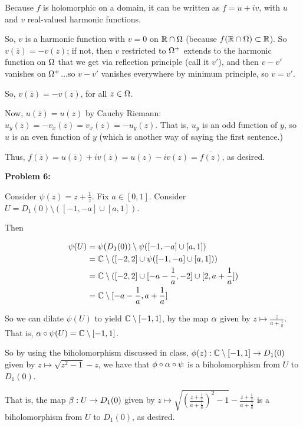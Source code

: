 \documentclass[a4paper,12pt]{article}
\begin{document}
Because $f$ is holomorphic on a domain, it can be written as $f=u+iv$, with $u$ and $v$ real-valued harmonic functions. 

So, $v$ is a harmonic function with $v=0$ on $\mathbb{R} \cap \Omega$ (because $f(\mathbb{R} \cap \Omega) \subset \mathbb{R}$). So $v(\overline{z}) = -v(z)$; if not, then $v$ restricted to $\Omega^+$ extends to the harmonic function on $\Omega$ that we get via reflection principle (call it $v'$), and then $v-v'$ vanishes on $\Omega^+$...so $v-v'$ vanishes everywhere by minimum principle, so $v=v'$. 

So, $v(\overline{z}) = -v(z)$, for all $z \in \Omega$.

Now, $u(\overline{z}) = u(z)$ by Cauchy Riemann: $u_y(\overline{z}) = -v_x(\overline{z}) = v_x(z) = -u_y(z)$. That is, $u_y$ is an odd function of $y$, so $u$ is an even function of $y$ (which is another way of saying the first sentence.)

Thus, $f(\overline{z}) = u(\overline{z}) + iv(\overline{z}) = u(z) -iv(z) = \overline{f(z)}$, as desired.

\shunt

{\bf Problem 6:}

Consider $\psi(z) = z + \frac{1}{z}$. Fix $a \in [0,1]$. Consider $U = D_1(0) \setminus ([-1,-a] \cup [a,1])$.

Then 

\begin{align*}
\psi(U) &= \psi(D_1(0)) \setminus \psi([-1,-a] \cup [a,1])\\
&= \mathbb{C} \setminus ([-2,2] \cup \psi([-1,-a] \cup [a,1]))\\
&= \mathbb{C} \setminus ([-2,2] \cup [-a-\frac{1}{a},-2]\cup [2,a+\frac{1}{a}])\\
&= \mathbb{C} \setminus [-a-\frac{1}{a},a+\frac{1}{a}]
\end{align*}

So we can dilate $\psi(U)$ to yield $\mathbb{C} \setminus [-1,1]$, by the map $\alpha$ given by $z \mapsto \frac{z}{a+\frac{1}{a}}$. That is, $\alpha \circ \psi (U) = \mathbb{C} \setminus [-1,1]$.

So by using the biholomorphism discussed in class, $\phi(z): \mathbb{C} \setminus [-1,1] \to D_1(0)$ given by $z \mapsto \sqrt{z^2-1} -z$, we have that $\phi \circ \alpha \circ \psi$ is a biholomorphism from $U$ to $D_1(0)$.

That is, the map $\beta: U \to D_1(0)$ given by $z \mapsto \sqrt{(\frac{z + \frac{1}{z}}{a+\frac{1}{a}})^2 - 1} - \frac{z + \frac{1}{z}}{a+\frac{1}{a}}$ is a biholomorphism from $U$ to $D_1(0)$, as desired.

\shunt
\end{document}
